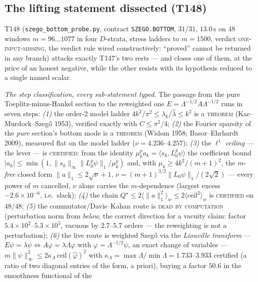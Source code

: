 \documentclass[11pt,a4paper]{article}
\begin{document}
\subsection{The lifting statement dissected (T148)}
T148 (\texttt{szego\_bottom\_probe.py}, contract \texttt{SZEGO.BOTTOM}, $31/31$, $13.0$\,s on
$48$ windows $m=96\ldots1077$ in four $D$-strata, stress ladders to $m=1500$, verdict
\textsc{one-input-missing}, the verdict rule wired constructively: ``proved'' cannot be returned
in any branch) attacks exactly T147's two rests --- and closes one of them, at the price of an
honest negative, while the other resists with its hypothesis reduced to a single named scalar.

\emph{The step classification, every sub-statement typed.} The passage from the pure
Toeplitz-minus-Hankel section to the reweighted one $E=\Lambda^{-1/2}A\Lambda^{-1/2}$ runs in
seven steps: \emph{(1)} the order-2 model ladder $4k^2/\pi^2\le\lambda_k/\hat\lambda\le k^2$ is
a \textsc{theorem} (Kac--Murdock--Szeg\H{o} 1953), verified exactly with $C\le\pi^2/4$;
\emph{(2)} the Fourier sparsity of the \emph{pure} section's bottom mode is a \textsc{theorem}
(Widom 1958; Basor--Ehrhardt 2009), measured flat on the model ladder ($\nu=4.236$--$4.257$);
\emph{(3)} the $\ell^1$ \emph{ceiling} --- the lever --- is \textsc{certified}: from the
identity $\mu_k^pa_k=\langle s_k,L_0^p\psi\rangle$ the coefficient bound
$|a_k|\le\min(1,\|s_k\|_\infty\|L_0^p\psi\|_1/\mu_k^p)$ and, with $\mu_k\ge4k^2/(m+1)^2$, the
$m$-\emph{free} closed form $\|a\|_1\le2\sqrt\nu+1$,
$\nu=(m+1)^{3/2}\|L_0\psi\|_1/(2\sqrt2)$ --- every power of $m$ cancelled, $\nu$ alone carries
the $m$-dependence (largest excess $-2.6\times10^{-6}$, i.e.\ slack); \emph{(4)} the chain
$Q^\star\le2\langle\|a\|_1^2\rangle_w\le2\langle\mathrm{ceil}^2\rangle_w$ is \textsc{certified}
on $48/48$; \emph{(5)} the commutator/Davis--Kahan route is \textsc{dead by computation}
(perturbation norm from \emph{below}, the correct direction for a vacuity claim: factor
$5.4\times10^{2}$--$5.3\times10^{5}$, vacuous by $2.7$--$5.7$ orders --- the reweighting is not
a perturbation); \emph{(6)} the live route is weighted Szeg\H{o} via the \emph{Liouville
transform} --- $E\psi=\lambda\psi\Leftrightarrow A\varphi=\lambda\Lambda\varphi$ with
$\varphi=\Lambda^{-1/2}\psi$, an exact change of variables ---
$m\|\psi\|_\infty^2\le2\kappa_\Lambda\,\mathrm{ceil}(\hat\varphi)^2$ with
$\kappa_\Lambda=\max\Lambda/\min\Lambda=1.733$--$3.933$ certified (a ratio of two diagonal
entries of the form, a priori), buying a factor $50.6$ in the smoothness functional of the
\end{document}

